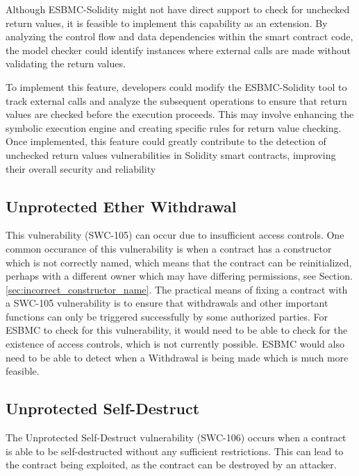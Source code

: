 Although ESBMC-Solidity might not have direct support to check for unchecked return values, it is feasible to implement this capability as an extension. By analyzing the control flow and data dependencies within the smart contract code, the model checker could identify instances where external calls are made without validating the return values.

To implement this feature, developers could modify the ESBMC-Solidity tool to track external calls and analyze the subsequent operations to ensure that return values are checked before the execution proceeds. This may involve enhancing the symbolic execution engine and creating specific rules for return value checking. Once implemented, this feature could greatly contribute to the detection of unchecked return values vulnerabilities in Solidity smart contracts, improving their overall security and reliability

\subsection{Unprotected Ether Withdrawal}
\label{sec:unprotected_ether_withdrawal}

This vulnerability (SWC-105) can occur due to insufficient access controls. One common occurance of this vulnerability is when a contract has a constructor which is not correctly named, which means that the contract can be reinitialized, perhaps with a different owner which may have differing permissions, see Section. \ref{sec:incorrect_constructor_name}. The practical means of fixing a contract with a SWC-105 vulnerability is to ensure that withdrawals and other important functions can only be triggered successfully by some authorized parties. For ESBMC to check for this vulnerability, it would need to be able to check for the existence of access controls, which is not currently possible. ESBMC would also need to be able to detect when a Withdrawal is being made which is much more feasible.

\subsection{Unprotected Self-Destruct}
\label{sec:unprotected_self_destruct}

The Unprotected Self-Destruct vulnerability (SWC-106) occurs when a contract is able to be self-destructed without any sufficient restrictions. This can lead to the contract being exploited, as the contract can be destroyed by an attacker.

